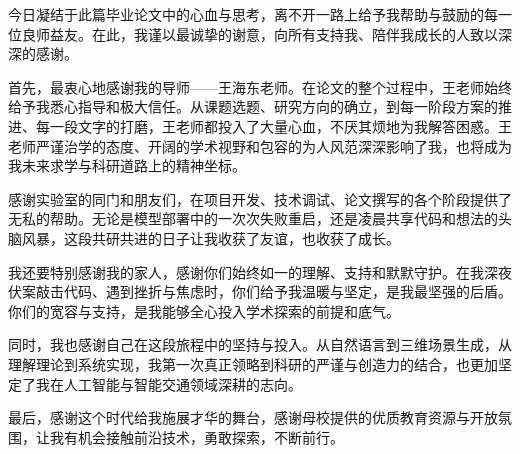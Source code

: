 \begin{acknowledgements} 

今日凝结于此篇毕业论文中的心血与思考，离不开一路上给予我帮助与鼓励的每一位良师益友。在此，我谨以最诚挚的谢意，向所有支持我、陪伴我成长的人致以深深的感谢。

首先，最衷心地感谢我的导师——王海东老师。在论文的整个过程中，王老师始终给予我悉心指导和极大信任。从课题选题、研究方向的确立，到每一阶段方案的推进、每一段文字的打磨，王老师都投入了大量心血，不厌其烦地为我解答困惑。王老师严谨治学的态度、开阔的学术视野和包容的为人风范深深影响了我，也将成为我未来求学与科研道路上的精神坐标。

感谢实验室的同门和朋友们，在项目开发、技术调试、论文撰写的各个阶段提供了无私的帮助。无论是模型部署中的一次次失败重启，还是凌晨共享代码和想法的头脑风暴，这段共研共进的日子让我收获了友谊，也收获了成长。

我还要特别感谢我的家人，感谢你们始终如一的理解、支持和默默守护。在我深夜伏案敲击代码、遇到挫折与焦虑时，你们给予我温暖与坚定，是我最坚强的后盾。你们的宽容与支持，是我能够全心投入学术探索的前提和底气。

同时，我也感谢自己在这段旅程中的坚持与投入。从自然语言到三维场景生成，从理解理论到系统实现，我第一次真正领略到科研的严谨与创造力的结合，也更加坚定了我在人工智能与智能交通领域深耕的志向。

最后，感谢这个时代给我施展才华的舞台，感谢母校提供的优质教育资源与开放氛围，让我有机会接触前沿技术，勇敢探索，不断前行。

\end{acknowledgements}